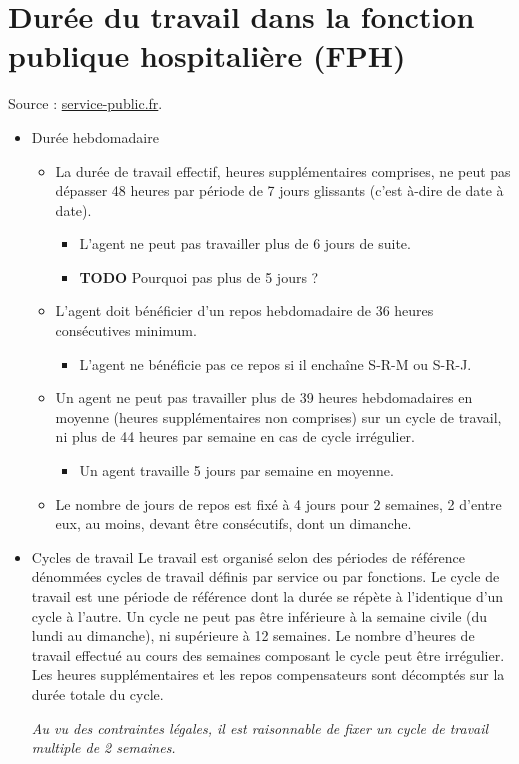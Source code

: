 \documentclass[a4paper]{article}       %
\begin{document}
\section*{Durée du travail dans la fonction publique hospitalière (FPH)}
Source : \href{https://www.service-public.fr/particuliers/vosdroits/F573}{service-public.fr}.

\begin{itemize}
\item Durée hebdomadaire
\begin{itemize}
\item La durée de travail effectif, heures supplémentaires comprises, ne peut pas dépasser 48 heures par période de 7 jours glissants (c'est à-dire de date à date).
\begin{itemize}
\item L'agent ne peut pas travailler plus de 6 jours de suite.
\end{itemize}
\begin{itemize}
\item {\bfseries\sffamily TODO} Pourquoi pas plus de 5 jours ?
\end{itemize}
\item L'agent doit bénéficier d'un repos hebdomadaire de 36 heures consécutives minimum.
\begin{itemize}
\item L'agent ne bénéficie pas ce repos si il enchaîne S-R-M ou S-R-J.
\end{itemize}
\item Un agent ne peut pas travailler plus de 39 heures hebdomadaires en moyenne (heures supplémentaires non comprises) sur un cycle de travail, ni plus de 44 heures par semaine en cas de cycle irrégulier.
\begin{itemize}
\item Un agent travaille 5 jours par semaine en moyenne.
\end{itemize}
\item Le nombre de jours de repos est fixé à 4 jours pour 2 semaines, 2 d'entre eux, au moins, devant être consécutifs, dont un dimanche.
\end{itemize}
\item Cycles de travail
Le travail est organisé selon des périodes de référence dénommées cycles de travail définis par service ou par fonctions.
Le cycle de travail est une période de référence dont la durée se répète à l'identique d'un cycle à l'autre. 
Un cycle ne peut pas être inférieure à la semaine civile (du lundi au dimanche), ni supérieure à 12 semaines. 
Le nombre d'heures de travail effectué au cours des semaines composant le cycle peut être irrégulier. 
Les heures supplémentaires et les repos compensateurs sont décomptés sur la durée totale du cycle. 

\emph{Au vu des contraintes légales, il est raisonnable de fixer un cycle de travail multiple de 2 semaines.}
\end{itemize}
\end{document}
